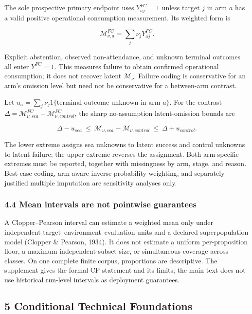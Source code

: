 \documentclass[
  11pt]{article}
\begin{document}
The sole prospective primary endpoint uses \(Y^{FC}_{aj}=1\) unless
target \(j\) in arm \(a\) has a valid positive operational consumption
measurement. Its weighted form is

\[\mathcal M^{FC}_{\nu,a}=\sum_j\nu_jY^{FC}_{aj}.\tag{5}\]

Explicit abstention, observed non-attendance, and unknown terminal
outcomes all enter \(Y^{FC}=1\). This measures failure to obtain
confirmed operational consumption; it does not recover latent
\(\mathcal M_\nu\). Failure coding is conservative for an arm's omission
level but need not be conservative for a between-arm contrast.

Let \(u_a=\sum_j\nu_j1\{\text{terminal outcome unknown in arm }a\}\).
For the contrast
\(\Delta=\mathcal M^{FC}_{\nu,sea}-\mathcal M^{FC}_{\nu,control}\), the
sharp no-assumption latent-omission bounds are

\[\Delta-u_{sea}\ \le\ \mathcal M_{\nu,sea}-\mathcal M_{\nu,control}\ \le\ \Delta+u_{control}.\tag{6}\]

The lower extreme assigns sea unknowns to latent success and control
unknowns to latent failure; the upper extreme reverses the assignment.
Both arm-specific extremes must be reported, together with missingness
by arm, stage, and reason. Best-case coding, arm-aware
inverse-probability weighting, and separately justified multiple
imputation are sensitivity analyses only.

\subsubsection{4.4 Mean intervals are not pointwise
guarantees}\label{mean-intervals-are-not-pointwise-guarantees}

A Clopper--Pearson interval can estimate a weighted mean only under
independent target--environment--evaluation units and a declared
superpopulation model (Clopper \& Pearson, 1934). It does not estimate a
uniform per-proposition floor, a maximum independent-subset size, or
simultaneous coverage across classes. On one complete finite corpus,
proportions are descriptive. The supplement gives the formal CP
statement and its limits; the main text does not use historical
run-level intervals as deployment guarantees.

\subsection{5 Conditional Technical
Foundations}\label{conditional-technical-foundations}
\end{document}
